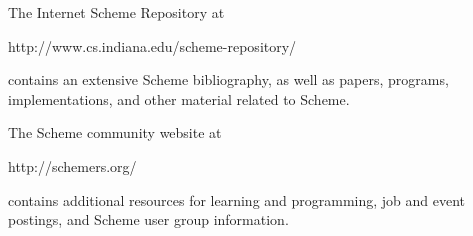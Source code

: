 
The Internet Scheme Repository at
\begin{center}
{\cf http://www.cs.indiana.edu/scheme-repository/}
\end{center}
contains an extensive Scheme bibliography, as well as papers,
programs, implementations, and other material related to Scheme.

The Scheme community website at
\begin{center}
{\cf http://schemers.org/}
\end{center}
contains additional resources for learning and programming, job and
event postings, and Scheme user group information.
